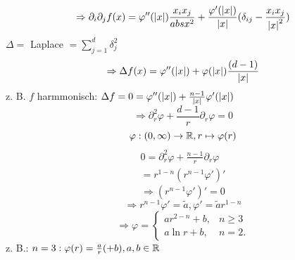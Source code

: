 \documentclass[../ana2.tex]{subfiles}
\begin{document}
\[ \Rightarrow \partial_i \partial_j f(x) 
= \varphi''(\left|x\right|) \frac{x_i x_j}{abs{x}^2}
+ \frac{\varphi'(\left|x\right|)}{\left|x\right|} (\delta_{ij} 
- \frac{x_i x_j}{\left|x\right|^2}) \]
\( \Delta = \) Laplace \( = \sum_{j=1}^d \delta_j^2 \)
\[ \Rightarrow \Delta f(x) 
= \varphi''(\left|x\right|) + \varphi(\left|x\right|) 
\frac{(d-1)}{\left|x\right|} \]
z. B. \( f \) harmmonisch: \( \Delta f = 0
= \varphi''(\left|x\right|) + \frac{n-1}{\left|x\right|} \varphi'(\left|x\right|) \)
\[ \Rightarrow \partial_r^2 \varphi + \frac{d-1}{r} \partial_r \varphi = 0 \]
\[ \varphi:(0,\infty)\rightarrow \mathbb{R}, r \mapsto \varphi(r) \]
\begin{align*}
    0 = \partial_r^2 \varphi + \frac{n-1}{r} \partial_r \varphi \\
    = r^{1-n} ( r^{n-1}\varphi')'
\end{align*}
\[ \Rightarrow (r^{n-1}\varphi')' = 0 \]
\[ \Rightarrow r^{n-1} \varphi' = \tilde{a}, 
\varphi' = \tilde{a} r^{1-n} \]
\[ \Rightarrow \varphi =
\begin{cases}
    a r^{2-n} + b, &n \geq 3\\
    a \ln r + b, & n = 2.
\end{cases} \]
z. B.: \( n=3: \varphi(r) = \frac{a}{r} (+b), a,b\in \mathbb{R} \)
\end{document}
